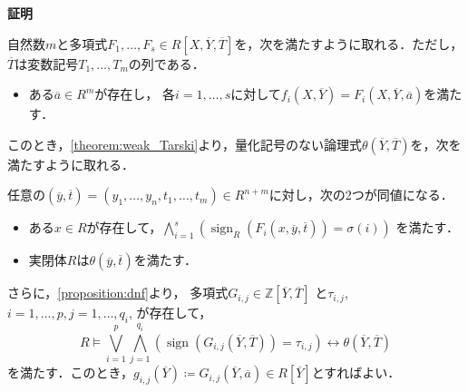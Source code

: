 \documentclass[uplatex, dvipdfmx]{jsarticle}
\makeatletter
\numberwithin{equation}{section}
\renewenvironment{proof}[1][\proofname]{\par
  \pushQED{\qed}%
  \normalfont \topsep6\p@\@plus6\p@\relax
  \trivlist
  \item\relax
  {\bfseries
  #1\@addpunct{.}}\hspace\labelsep\ignorespaces
}{
  \popQED\endtrivlist\@endpefalse
}
\newcommand{\Z}{\mathbb{Z}}
\DeclareMathOperator{\sign}{sign}
\theoremstyle{definition}
\renewcommand{\proofname}{\textbf{証明}}
\makeatother
\begin{document}
\begin{proof}
     自然数$m$と多項式$F_1, \dots, F_s \in R[X, \overline{Y}, \overline{T}]$を，次を満たすように取れる．ただし，$\overline{T}$は変数記号$T_1, \dots, T_m$の列である．
     \begin{itemize}     
          \item   
               ある$\overline{a} \in R^m$が存在し，
               各$i=1, \dots, s$に対して$f_i(X,\overline{Y}) = F_i(X,\overline{Y}, \overline{a})$を満たす．
     \end{itemize}
     このとき，\cref{theorem:weak_Tarski}より，量化記号のない論理式$\theta(\overline{Y}, \overline{T})$を，次を満たすように取れる．

     任意の$(\overline{y}, \overline{t}) = (y_1, \dots, y_n, t_1, \dots, t_m) \in R^{n+m}$に対し，次の2つが同値になる．
     \begin{itemize}
          \item
               ある$x \in R$が存在して，$\bigwedge_{i=1}^s (\sign_R(F_i(x,\overline{y}, \overline{t})) = \sigma(i))$ を満たす．
          \item
               実閉体$R$は$\theta(\overline{y}, \overline{t})$を満たす．         
     \end{itemize}
     さらに，\cref{proposition:dnf}より，%
     多項式$G_{i,j} \in \Z[\overline{Y}, \overline{T}]$ と$\tau_{i,j}$, $i=1, \dots, p, j=1, \dots, q_i$, が存在して，
     \begin{equation}
          R \models
          \bigvee_{i=1}^p \bigwedge_{j=1}^{q_i}(\sign(G_{i,j}(\overline{Y}, \overline{T}))=\tau_{i,j})
          \leftrightarrow \theta(\overline{Y},\overline{T})
     \end{equation}
     を満たす．このとき，$g_{i,j}(\overline{Y}) \coloneqq G_{i,j}(\overline{Y}, \overline{a}) \in R[\overline{Y}]$とすればよい．
\end{proof}
\end{document}
